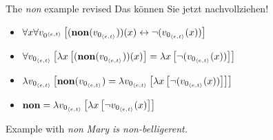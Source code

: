 \begin{frame}
  {The \emph{non} example revised \citep[104]{DowtyEa1981}}
  \onslide<+->
  \onslide<+->
  Das können Sie jetzt nachvollziehen!\\
  \Zeile
  \begin{itemize}[<+->]
    \item $\forall{}x\forall{}v_{0^{{\langle{}e,t\rangle}}}\left[{}(\mathbf{non}(v_{0_{{\langle{}e,t\rangle}}}))(x)\leftrightarrow\neg{}(v_{0_{{\langle{}e,t\rangle}}}(x))\right]$
    \item $\forall{}v_{0_{{\langle{}e,t\rangle}}}\left[{}\lambda{}x\left[{}(\mathbf{non}(v_{0_{{\langle{}e,t\rangle}}}))(x)\right]=\lambda{}x\left[{}\neg{}(v_{0_{{\langle{}e,t\rangle}}}(x))\right]\right]$
    \item $\lambda{}v_{0_{{\langle{}e,t\rangle}}}\left[{}\mathbf{non}(v_{0_{{\langle{}e,t\rangle}}})=\lambda{}v_{0_{{\langle{}e,t\rangle}}}\left[{}\lambda{}x\left[{}\neg{}(v_{0_{{\langle{}e,t\rangle}}}(x))\right]\right]\right]$
    \item %
    $\mathbf{non}=\lambda{}v_{0_{{\langle{}e,t\rangle}}}\left[{}\lambda{x}\left[{}\neg{}v_{0_{{\langle{}e,t\rangle}}}(x)\right]\right]$
  \end{itemize}
\end{frame}

\begin{frame}
  {Example with \textit{non}}
  \onslide<+->
  \onslide<+->
  \textit{Mary is non-belligerent.}\\
  \Viertelzeile
  \\
  \onslide<+->
  \Zeile
  \centering 
\end{frame}


